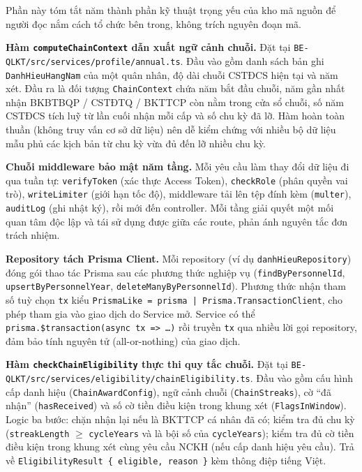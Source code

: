 \documentclass[../DoAn.tex]{subfiles}
\begin{document}
Phần này tóm tắt năm thành phần kỹ thuật trọng yếu của kho mã nguồn để người đọc nắm cách tổ chức bên trong, không trích nguyên đoạn mã.

\textbf{Hàm \texttt{computeChainContext} dẫn xuất ngữ cảnh chuỗi.} Đặt tại \texttt{BE-QLKT/src/services/profile/annual.ts}. Đầu vào gồm danh sách bản ghi \texttt{DanhHieuHangNam} của một quân nhân, độ dài chuỗi CSTĐCS hiện tại và năm xét. Đầu ra là đối tượng \texttt{ChainContext} chứa năm bắt đầu chuỗi, năm gần nhất nhận BKBTBQP / CSTĐTQ / BKTTCP còn nằm trong cửa sổ chuỗi, số năm CSTĐCS tích luỹ từ lần cuối nhận mỗi cấp và số chu kỳ đã lỡ. Hàm hoàn toàn thuần (không truy vấn cơ sở dữ liệu) nên dễ kiểm chứng với nhiều bộ dữ liệu mẫu phủ các kịch bản từ chu kỳ vừa đủ đến lỡ nhiều chu kỳ.

\textbf{Chuỗi middleware bảo mật năm tầng.} Mỗi yêu cầu làm thay đổi dữ liệu đi qua tuần tự: \texttt{verifyToken} (xác thực Access Token), \texttt{checkRole} (phân quyền vai trò), \texttt{writeLimiter} (giới hạn tốc độ), middleware tải lên tệp đính kèm (\texttt{multer}), \texttt{auditLog} (ghi nhật ký), rồi mới đến controller. Mỗi tầng giải quyết một mối quan tâm độc lập và tái sử dụng được giữa các route, phản ánh nguyên tắc đơn trách nhiệm.

\textbf{Repository tách Prisma Client.} Mỗi repository (ví dụ \texttt{danhHieuRepository}) đóng gói thao tác Prisma sau các phương thức nghiệp vụ (\texttt{findByPersonnelId}, \texttt{upsertByPersonnelYear}, \texttt{deleteManyByPersonnelId}). Phương thức nhận tham số tuỳ chọn \texttt{tx} kiểu \texttt{PrismaLike = prisma | Prisma.TransactionClient}, cho phép tham gia vào giao dịch do Service mở. Service có thể \texttt{prisma.\$transaction(async tx => \dots)} rồi truyền \texttt{tx} qua nhiều lời gọi repository, đảm bảo tính nguyên tử (all-or-nothing) của giao dịch.

\textbf{Hàm \texttt{checkChainEligibility} thực thi quy tắc chuỗi.} Đặt tại \texttt{BE-QLKT/src/services/eligibility/chainEligibility.ts}. Đầu vào gồm cấu hình cấp danh hiệu (\texttt{ChainAwardConfig}), ngữ cảnh chuỗi (\texttt{ChainStreaks}), cờ ``đã nhận'' (\texttt{hasReceived}) và số cờ tiền điều kiện trong khung xét (\texttt{FlagsInWindow}). Logic ba bước: chặn nhận lại nếu là BKTTCP cá nhân đã có; kiểm tra đủ chu kỳ (\texttt{streakLength} $\ge$ \texttt{cycleYears} và là bội số của \texttt{cycleYears}); kiểm tra đủ cờ tiền điều kiện trong khung xét cùng yêu cầu NCKH (nếu cấp danh hiệu yêu cầu). Trả về \texttt{EligibilityResult \{ eligible, reason \}} kèm thông điệp tiếng Việt.
\end{document}
